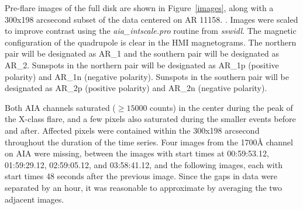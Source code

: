 Pre-flare images of the full disk are shown in Figure~\ref{images},
along with a 300x198 arcsecond subset of the data centered on AR 11158.
\citep{McAteer2003,McAteer2004}.
Images were scaled to improve contrast using the
\textit{aia\_intscale.pro} routine from \textit{sswidl}.
The magnetic configuration of the quadrupole is clear in the HMI magnetograms.
The northern pair will be designated as AR\_1
and the southern pair will be designated as AR\_2.
Sunspots in the northern pair will be designated as AR\_1p (positive polarity)
and AR\_1n (negative polarity).
Sunspots in the southern pair will be designated as AR\_2p (positive polarity)
and AR\_2n (negative polarity).

Both AIA channels saturated ($\geq\!15000$ counts) in the center
during the peak of the X-class flare, and a few pixels also saturated
during the smaller events before and after.
Affected pixels were  contained within the
300x198 arcsecond 
throughout the duration of the time series.
Four images from the 1700\AA{} channel on AIA were missing, between
the images with start times at
00:59:53.12,
01:59:29.12,
02:59:05.12, and
03:58:41.12, and the following images, each with start times
48 seconds after the previous image.
Since the gaps in data were separated by an hour,
it was reasonable to approximate 
by averaging the two adjacent images.
